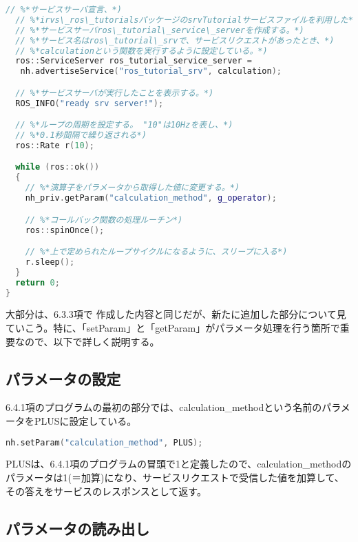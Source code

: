 \begin{lstlisting}[language=C++]
  // %*サービスサーバ宣言、*)
  // %*irvs\_ros\_tutorialsパッケージのsrvTutorialサービスファイルを利用した*)
  // %*サービスサーバros\_tutorial\_service\_serverを作成する。*)
  // %*サービス名はros\_tutorial\_srvで、サービスリクエストがあったとき、*)
  // %*calculationという関数を実行するように設定している。*)
  ros::ServiceServer ros_tutorial_service_server =
   nh.advertiseService("ros_tutorial_srv", calculation);

  // %*サービスサーバが実行したことを表示する。*)
  ROS_INFO("ready srv server!");

  // %*ループの周期を設定する。 "10"は10Hzを表し、*)
  // %*0.1秒間隔で繰り返される*)
  ros::Rate r(10);

  while (ros::ok())
  {
    // %*演算子をパラメータから取得した値に変更する。*)
    nh_priv.getParam("calculation_method", g_operator);

    // %*コールバック関数の処理ルーチン*)
    ros::spinOnce();

    // %*上で定められたループサイクルになるように、スリープに入る*)
    r.sleep();
  }
  return 0;
}
\end{lstlisting}

大部分は、6.3.3項で  作成した内容と同じだが、新たに追加した部分について見ていこう。特に、「setParam」と「getParam」がパラメータ処理を行う箇所で重要なので、以下で詳しく説明する。

\subsection{パラメータの設定}

6.4.1項のプログラムの最初の部分では、calculation\_methodという名前のパラメータをPLUSに設定している。

\begin{lstlisting}[language=C++]
nh.setParam("calculation_method", PLUS);
\end{lstlisting}

PLUSは、6.4.1項のプログラムの冒頭で1と定義したので、calculation\_methodのパラメータは1(＝加算)になり、サービスリクエストで受信した値を加算して、その答えをサービスのレスポンスとして返す。

\subsection{パラメータの読み出し}

